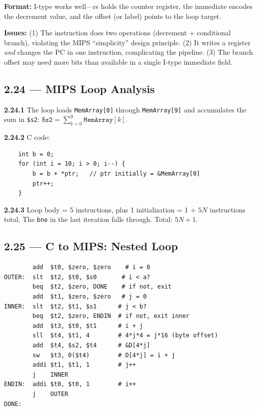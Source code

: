 \textbf{Format:} I-type works well---rs holds the counter register, the
immediate encodes the decrement value, and the offset (or label) points to
the loop target.

\textbf{Issues:} (1) The instruction does two operations (decrement +
conditional branch), violating the MIPS ``simplicity'' design principle.
(2) It writes a register \emph{and} changes the PC in one instruction,
complicating the pipeline. (3) The branch offset may need more bits than
available in a single I-type immediate field.

\subsection*{2.24 --- MIPS Loop Analysis}
\hypertarget{sol-2.24}{}

\noindent\textbf{2.24.1}
The loop loads \texttt{MemArray[0]} through \texttt{MemArray[9]} and
accumulates the sum in \texttt{\$s2}:
$\texttt{\$s2} = \sum_{k=0}^{9} \texttt{MemArray}[k]$.

\noindent\textbf{2.24.2} C code:
\begin{verbatim}
    int b = 0;
    for (int i = 10; i > 0; i--) {
        b = b + *ptr;   // ptr initially = &MemArray[0]
        ptr++;
    }
\end{verbatim}

\noindent\textbf{2.24.3}
Loop body = 5 instructions, plus 1 initialization = 1 + $5N$
instructions total. The \texttt{bne} in the last iteration falls through.
Total: $5N + 1$.

\subsection*{2.25 --- C to MIPS: Nested Loop}
\hypertarget{sol-2.25}{}

\begin{verbatim}
        add  $t0, $zero, $zero    # i = 0
OUTER:  slt  $t2, $t0, $s0       # i < a?
        beq  $t2, $zero, DONE    # if not, exit
        add  $t1, $zero, $zero   # j = 0
INNER:  slt  $t2, $t1, $s1      # j < b?
        beq  $t2, $zero, ENDIN  # if not, exit inner
        add  $t3, $t0, $t1      # i + j
        sll  $t4, $t1, 4        # 4*j*4 = j*16 (byte offset)
        add  $t4, $s2, $t4      # &D[4*j]
        sw   $t3, 0($t4)        # D[4*j] = i + j
        addi $t1, $t1, 1        # j++
        j    INNER
ENDIN:  addi $t0, $t0, 1        # i++
        j    OUTER
DONE:
\end{verbatim}


